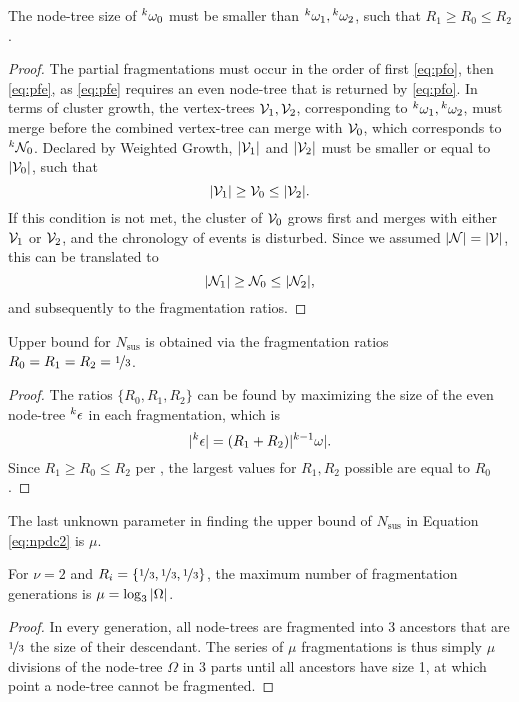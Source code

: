 \begin{lemma}\label{lem:chrono}
  The node-tree size of ${}^{k}\omega_0$ must be smaller than ${}^{k}\omega_1, {}^{k}\omega_2$, such that $R_1 \geq R_0 \leq R_2$. 
\end{lemma}
\begin{proof}
  The partial fragmentations must occur in the order of first \eqref{eq:pfo}, then \eqref{eq:pfe}, as \eqref{eq:pfe} requires an even node-tree that is returned by \eqref{eq:pfo}. In terms of cluster growth, the vertex-trees $\mathcal{V}_1, \mathcal{V}_2$, corresponding to ${}^{k}\omega_1, {}^{k}\omega_2$, must merge before the combined vertex-tree can merge with $\mathcal{V}_0$, which corresponds to ${}^{k}\mathcal{N}_0$. Declared by Weighted Growth, $\lvert\mathcal{V}_1\rvert$ and $\lvert\mathcal{V}_2\rvert$ must be smaller or equal to $\lvert\mathcal{V}_0\rvert$, such that 
  \begin{equation*}
    \lvert\mathcal{V}_1\rvert\geq \mathcal{V}_0 \leq\lvert\mathcal{V}_2\rvert.
  \end{equation*}
  If this condition is not met, the cluster of $\mathcal{V}_0$ grows first and merges with either $\mathcal{V}_1$ or $\mathcal{V}_2$, and the chronology of events is disturbed. Since we assumed $\lvert\mathcal{N}\rvert=\lvert\mathcal{V}\rvert$, this can be translated to 
  \begin{equation*}
    \lvert\mathcal{N}_1\rvert\geq \mathcal{N}_0 \leq\lvert\mathcal{N}_2\rvert,
  \end{equation*}
  and subsequently to the fragmentation ratios.
\end{proof}

\begin{theorem}\label{the:ratios}
  Upper bound for $N_{\text{sus}}$ is obtained via the fragmentation ratios $R_0 = R_1 = R_2 = \nicefrac{1}{3}$.
\end{theorem}
\begin{proof}
  The ratios $\{R_0, R_1, R_2\}$ can be found by maximizing the size of the even node-tree ${}^{k}\epsilon$ in each fragmentation, which is 
  \begin{equation*}
    \lvert{}^{k}\epsilon\rvert = (R_1 + R_2)\lvert{}^{k-1}\omega\rvert.
  \end{equation*}
  Since $ R_1 \geq R_0 \leq R_2$ per , the largest values for $R_1, R_2$ possible are equal to $R_0$.
\end{proof}

The last unknown parameter in finding the upper bound of $N_{\text{sus}}$ in Equation \eqref{eq:npdc2} is $\mu$.

\begin{theorem}\label{the:km}
  For $\nu = 2$ and $R_i = \{\nicefrac{1}{3},\nicefrac{1}{3},\nicefrac{1}{3}\}$, the maximum number of fragmentation generations is $\mu = \log_3{\lvert\Omega\rvert}$.
\end{theorem}
\begin{proof}
  In every generation, all node-trees are fragmented into 3 ancestors that are $\nicefrac{1}{3}$ the size of their descendant. The series of $\mu$ fragmentations is thus simply $\mu$ divisions of the node-tree $\Omega$ in 3 parts until all ancestors have size 1, at which point a node-tree cannot be fragmented.
\end{proof}

